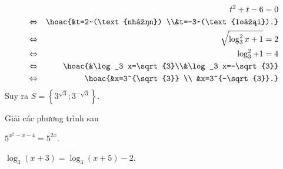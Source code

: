 \begin{bt}
{\begin{enumerate}
\begin{eqnarray*}
				&&  t^2+t-6=0
				 \\
				&\Leftrightarrow&\hoac{&t=2~(\text{nhận}) \\&t=-3~(\text{loại}).} 
				 \\
				& \Leftrightarrow& \sqrt{\log_3^2  x+1}=2
				\\ 
				&\Leftrightarrow&  \log_3^2+1=4
				 \\
				& \Leftrightarrow&\hoac{&\log_3 x=\sqrt{3}\\&\log_3 x=-\sqrt{3}} 
				 \\
				&  \Leftrightarrow&\hoac{&x=3^{\sqrt{3}} \\
				 &x=3^{-\sqrt{3}}.}
			\end{eqnarray*}
			Suy ra $S=\left\{3^{\sqrt{3}}; 3^{-\sqrt{3}}\right\}$. 
		\end{enumerate}
	 }
\end{bt}

\begin{bt}%
	Giải  các phương trình sau
	\begin{listEX}[2]
		\item  $5^{x^2-x-4}=5^{2x}$.
		\item $\log_3(x+3)=\log_3(x+5)-2$. 
	\end{listEX}
\end{bt}

